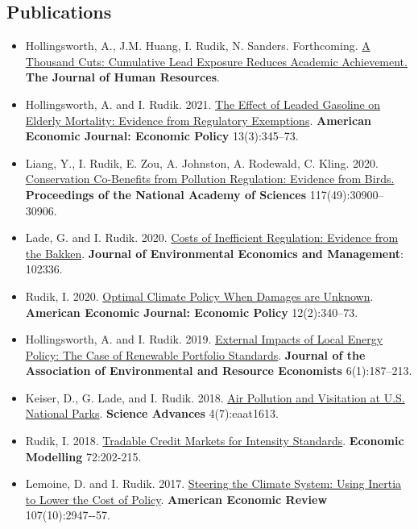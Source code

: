 \documentclass[12pt]{res} %
\begin{document}
\begin{resume}
\subsection{Publications}
\begin{itemize}
	\item[] Hollingsworth, A., J.M. Huang, I. Rudik, N. Sanders. Forthcoming. \href{https://www.nber.org/papers/w28250}{A Thousand Cuts: Cumulative Lead Exposure Reduces Academic Achievement.} \textbf{The Journal of Human Resources}.
	\item[] Hollingsworth, A. and I. Rudik. 2021. \href{https://osf.io/preprints/socarxiv/rdy6g}{The Effect of Leaded Gasoline on Elderly Mortality: Evidence from Regulatory Exemptions}. \textbf{American Economic Journal: Economic Policy} 13(3):345--73.
	\item[] Liang, Y., I. Rudik, E. Zou, A. Johnston, A. Rodewald, C. Kling. 2020. \href{https://www.pnas.org/content/early/2020/11/23/2013568117}{Conservation Co-Benefits from Pollution Regulation: Evidence from Birds.} \textbf{Proceedings of the National Academy of Sciences} 117(49):30900--30906.
	\item[] Lade, G. and I. Rudik. 2020. \href{https://papers.ssrn.com/sol3/papers.cfm?abstract_id=3086728}{Costs of Inefficient Regulation: Evidence from the Bakken}. \textbf{Journal of Environmental Economics and Management}: 102336.
	\item[] Rudik, I. 2020. \href{https://www.aeaweb.org/articles?id=10.1257/pol.20160541}{Optimal Climate Policy When Damages are Unknown}. \textbf{American Economic Journal: Economic Policy} 12(2):340--73.
	\item[] Hollingsworth, A. and I. Rudik. 2019. \href{http://papers.ssrn.com/sol3/papers.cfm?abstract_id=2697222}{External Impacts of Local Energy Policy: The Case of Renewable Portfolio Standards}. \textbf{Journal of the Association of Environmental and Resource Economists} 6(1):187--213.
	\item[] Keiser, D., G. Lade, and I. Rudik. 2018. \href{http://advances.sciencemag.org/content/4/7/eaat1613}{Air Pollution and Visitation at U.S. National Parks}. \textbf{Science Advances} 4(7):eaat1613.
	\item[] Rudik, I. 2018. \href{https://www.sciencedirect.com/science/article/pii/S0264999317315651}{Tradable Credit Markets for Intensity Standards}. \textbf{Economic Modelling} 72:202-215.
	\item[] Lemoine, D. and I. Rudik. 2017.  \href{http://papers.ssrn.com/sol3/papers.cfm?abstract_id=2443594}{Steering the Climate System: Using Inertia to Lower the Cost of Policy}. \textbf{American Economic Review} 107(10):2947‐-57.

\end{itemize}
\end{resume}
\end{document}
